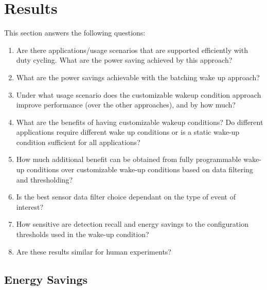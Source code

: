\section{Results}
\label{sec:results}

This section answers the following questions:

\begin{enumerate}
\setlength{\itemsep}{-3pt}  

\item Are there applications/usage scenarios that are supported
efficiently with duty cycling.  What are the power saving achieved by
this approach?

\item What are the power savings achievable with the batching wake up approach?

\item Under what usage scenario does the customizable wakeup condition approach improve
performance (over the other approaches), and by how much?

\item What are the benefits of having customizable wakeup conditions?  
Do different applications require different wake up conditions or is
a static wake-up condition sufficient for all applications? 

\item How much additional benefit can be obtained from fully programmable wake-up conditions 
over customizable wake-up conditions based on data filtering and thresholding?

\item Is the best sensor data filter choice dependant on the type of event of interest?

\item How sensitive are detection recall and energy savings to the configuration thresholds
used in the wake-up condition?

\item Are these results similar for human experiments?

\end{enumerate}



\subsection{Energy Savings}

